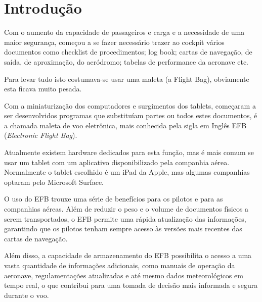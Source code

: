\chapter{Introdução}
Com o aumento da capacidade de passageiros e carga e a necessidade 
de uma maior segurança, começou a se fazer necessário trazer ao cockpit 
vários documentos como checklist de procedimentos; log book; cartas de 
navegação, de saída, de aproximação, do aeródromo; tabelas de performance
 da aeronave etc.

Para levar tudo isto costumava-se usar uma maleta (a Flight Bag), 
obviamente esta ficava muito pesada.

Com a miniaturização dos computadores e surgimentos dos tablets, 
começaram a ser desenvolvidos programas que substituíam partes ou 
todos estes documentos, é a chamada maleta de voo eletrônica, mais 
conhecida pela sigla em Inglês EFB (\textit{Electronic Flight Bag}).

Atualmente existem hardware dedicados para esta função, mas é mais 
comum se usar um tablet com um aplicativo disponibilizado pela companhia aérea.
Normalmente o tablet escolhido é um iPad da Apple, mas algumas companhias
optaram pelo Microsoft Surface. \cite{surface}

O uso do EFB trouxe uma série de benefícios para os pilotos e para as 
companhias aéreas. Além de reduzir o peso e o volume de documentos físicos 
a serem transportados, o EFB permite uma rápida atualização das informações, 
garantindo que os pilotos tenham sempre acesso às versões mais recentes das 
cartas de navegação. \cite{EFB-more-than}

Além disso, a capacidade de armazenamento do EFB possibilita o acesso a uma 
vasta quantidade de informações adicionais, como manuais de operação da aeronave, 
regulamentações atualizadas e até mesmo dados meteorológicos em tempo real, 
o que contribui para uma tomada de decisão mais informada e segura durante o voo.
